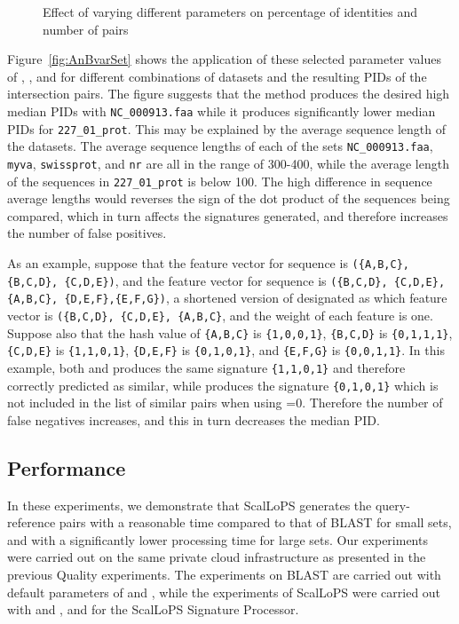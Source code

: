 \documentclass[titlepage]{csetr}
\begin{document}
\begin{figure}[t]
\centering
{}
\caption{Effect of varying different parameters on percentage of identities and number of pairs}
\label{fig:exp-quality-varSet}
\end{figure}

Figure~\ref{fig:AnBvarSet} shows the application of these selected parameter values of , , and  for different combinations of datasets and the resulting PIDs of the intersection pairs. The figure suggests that the method produces the desired high median PIDs with \texttt{NC\_000913.faa} while it produces significantly lower median PIDs for \texttt{227\_01\_prot}. This may be explained by the average sequence length of the datasets. The average sequence lengths of each of the sets \texttt{NC\_000913.faa}, \texttt{myva}, \texttt{swissprot}, and \texttt{nr} are all in the range of  300-400, while the average length of the sequences in \texttt{227\_01\_prot} is below 100. The high difference in sequence average lengths would reverses the sign of the dot product of the sequences being compared, which in turn affects the signatures generated, and therefore increases the number of false positives.

As an example, suppose that the feature vector for sequence \texttt{} is \texttt{(\{A,B,C\}, \{B,C,D\}, \{C,D,E\})}, and the feature vector for sequence \texttt{} is \texttt{(\{B,C,D\}, \{C,D,E\}, \{A,B,C\}, \{D,E,F\},\{E,F,G\})}, a shortened version of \texttt{} designated as \texttt{} which feature vector is \texttt{(\{B,C,D\}, \{C,D,E\}, \{A,B,C\}}, and the weight of each feature is one. Suppose also that the hash value of \texttt{\{A,B,C\}} is \texttt{\{1,0,0,1\}}, \texttt{\{B,C,D\}} is \texttt{\{0,1,1,1\}}, \texttt{\{C,D,E\}} is \texttt{\{1,1,0,1\}}, \texttt{\{D,E,F\}} is \texttt{\{0,1,0,1\}}, and \texttt{\{E,F,G\}} is \texttt{\{0,0,1,1\}}. In this example, both \texttt{} and \texttt{} produces the same signature \texttt{\{1,1,0,1\}} and therefore correctly predicted as similar, while \texttt{} produces the signature \texttt{\{0,1,0,1\}} which is not included in the list of similar pairs when using =0. Therefore the number of false negatives increases, and this in turn decreases the median PID.

\subsection{Performance}
In these experiments, we demonstrate that ScalLoPS generates the query-reference pairs with a reasonable time compared to that of BLAST for small sets, and with a significantly lower processing time for large sets. Our experiments were carried out on the same private cloud infrastructure as presented in the previous Quality experiments. The experiments on BLAST are carried out with default parameters of  and , while the experiments of ScalLoPS were carried out with  and , and  for the ScalLoPS Signature Processor.
\end{document}
